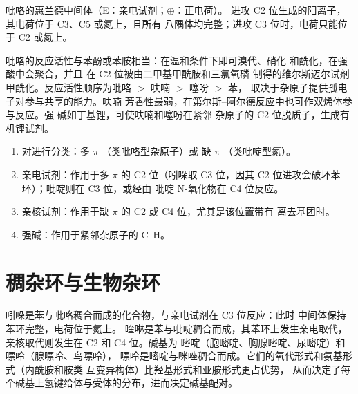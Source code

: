 \begin{omfigure}
{\small 吡咯的惠兰德中间体（E：亲电试剂；$\oplus$：正电荷）。
进攻 C2 位生成的阳离子，其电荷位于 C3、C5 或氮上，且所有
八隅体均完整；进攻 C3 位时，电荷只能位于 C2 或氮上。}
\end{omfigure}

吡咯的反应活性与苯酚或苯胺相当：在温和条件下即可溴代、硝化
和酰化，在强酸中会聚合，并且
在 C2 位被由二甲基甲酰胺和三氯氧磷
制得的维尔斯迈尔试剂甲酰化。反应活性顺序为吡咯 $>$ 呋喃 $>$ 噻吩 $>$ 苯，
取决于杂原子提供孤电子对参与共享的能力。呋喃
芳香性最弱，在第尔斯–阿尔德反应中也可作双烯体参与反应。强
碱如丁基锂，可使呋喃和噻吩在紧邻
杂原子的 C2 位脱质子，生成有机锂试剂。

\begin{method}[预测杂环上的进攻位点]\label{met:b3:heterocycles:site}
\begin{enumerate}
  \item 对进行分类：多 $\pi$ （类吡咯型杂原子）或
        缺 $\pi$ （类吡啶型氮）。
  \item 亲电试剂：作用于多 $\pi$ 的 C2 位（吲哚取 C3 位，因其
        C2 位进攻会破坏苯环）；吡啶则在 C3 位，或经由
        吡啶 N-氧化物在 C4 位反应。
  \item 亲核试剂：作用于缺 $\pi$ 的 C2 或 C4 位，尤其是该位置带有
        离去基团时。
  \item 强碱：作用于紧邻杂原子的 C--H。
\end{enumerate}
\end{method}

\section{稠杂环与生物杂环}

吲哚是苯与吡咯稠合而成的化合物，与亲电试剂在 C3 位反应：此时
中间体保持苯环完整，电荷位于氮上。
喹啉是苯与吡啶稠合而成，其苯环上发生亲电取代，
亲核取代则发生在 C2 和 C4 位。碱基为
嘧啶（胞嘧啶、胸腺嘧啶、尿嘧啶）和嘌呤（腺嘌呤、鸟嘌呤），
嘌呤是嘧啶与咪唑稠合而成。它们的氧代形式和氨基形式（内酰胺和胺类
互变异构体）比羟基形式和亚胺形式更占优势，
从而决定了每个碱基上氢键给体与受体的分布，进而决定碱基配对。

